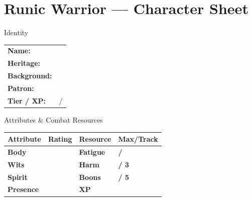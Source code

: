 \documentclass[10pt]{article}
\begin{document}
\newpage

\section*{Runic Warrior --- Character Sheet}

\begin{minipage}[t]{0.48\linewidth}
    \begin{charbox}{Identity}
        \begin{tabular}{p{2.5cm} p{5cm}}
            \textbf{Name:} & \underline{\hspace{4cm}} \\
            \textbf{Heritage:} & \underline{\hspace{4cm}} \\
            \textbf{Background:} & \underline{\hspace{4cm}} \\
            \textbf{Patron:} & \underline{\hspace{4cm}} \\
            \textbf{Tier / XP:} & \underline{\hspace{2cm}} / \underline{\hspace{2cm}} \\
        \end{tabular}
    \end{charbox}
    
    \vspace{0.5em}
    
    \begin{charbox}{Attributes \& Combat Resources}
        \begin{tabular}{>{\bfseries}p{2.5cm} >{\bfseries}p{1.5cm} >{\bfseries}p{2.5cm} >{\bfseries}p{1.5cm}}
            \toprule
            \textbf{Attribute} & \textbf{Rating} & \textbf{Resource} & \textbf{Max/Track} \\
            \midrule
            Body & \underline{\hspace{1.5cm}} & Fatigue & \underline{\hspace{1.5cm}} / \underline{\hspace{1.5cm}} \\
            Wits & \underline{\hspace{1.5cm}} & Harm & \underline{\hspace{1.5cm}} / 3 \\
            Spirit & \underline{\hspace{1.5cm}} & Boons & \underline{\hspace{1.5cm}} / 5 \\
            Presence & \underline{\hspace{1.5cm}} & XP & \underline{\hspace{1.5cm}} \\
            \bottomrule
        \end{tabular}
    \end{charbox}
    

\end{minipage}
\end{document}
